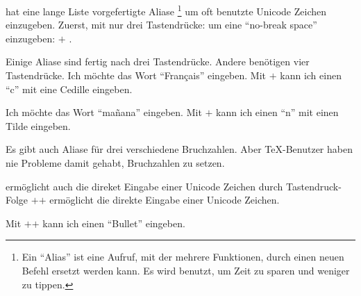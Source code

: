  hat eine lange Liste vorgefertigte Aliase%
\footnote{Ein \enquote{Alias} ist eine Aufruf, mit der
mehrere Funktionen, durch einen neuen Befehl ersetzt werden kann.
Es wird benutzt, um Zeit zu sparen und weniger zu tippen.}%
um oft benutzte Unicode Zeichen einzugeben. Zuerst, mit nur
drei Tastendrücke: um eine \enquote{no-break space} einzugeben: %
\hbox{\Ctrl$+$}%
%
\Spacebar .

Einige Aliase sind fertig nach drei Tastendrücke. Andere
benötigen vier Tastendrücke. Ich möchte das Wort \enquote{Français}
eingeben. Mit %
\hbox{\Ctrl$+$}%
\keystroke{,}%
%
\space%
kann ich einen \enquote{c} mit eine Cedille eingeben.

Ich möchte das Wort \enquote{mañana} eingeben. Mit %
\hbox{\Ctrl$+$}%
%
%
\space%
kann ich einen \enquote{n} mit einen Tilde eingeben.

Es gibt auch Aliase für drei verschiedene Bruchzahlen. Aber
\TeX{}-Benutzer haben nie Probleme damit gehabt, Bruchzahlen
zu setzen.

\label{unicodeviagedit}

 ermöglicht auch die direket Eingabe einer Unicode
Zeichen durch Tastendruck-Folge %
\hbox{\Shift$+$\Ctrl$+$}%
%
\Return{}%
\space%
ermöglicht die direkte Eingabe einer Unicode
Zeichen.

Mit %
\hbox{\Shift$+$\Ctrl$+$}%
%
%
%
%
\Return{}%
\space%
kann ich einen \enquote{Bullet} eingeben.







